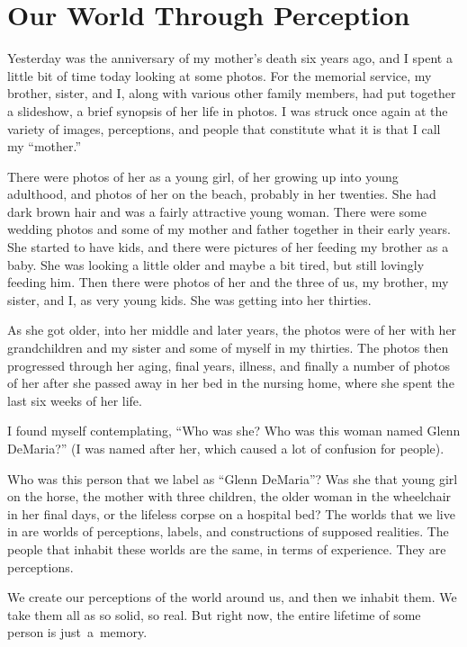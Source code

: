 
\chapter{Our World Through Perception}

Yesterday was the anniversary of my mother's death six years ago, and I spent a little bit of time today looking at some photos. For the memorial service, my brother, sister, and I, along with various other family members, had put together a slideshow, a brief synopsis of her life in photos. I was struck once again at the variety of images, perceptions, and people that constitute what it is that I call my ``mother.''

There were photos of her as a young girl, of her growing up into young adulthood, and photos of her on the beach, probably in her twenties. She had dark brown hair and was a fairly attractive young woman. There were some wedding photos and some of my mother and father together in their early years. She started to have kids, and there were pictures of her feeding my brother as a baby. She was looking a little older and maybe a bit tired, but still lovingly feeding him. Then there were photos of her and the three of us, my brother, my sister, and I, as very young kids. She was getting into her thirties.

As she got older, into her middle and later years, the photos were of her with her grandchildren and my sister and some of myself in my thirties. The photos then progressed through her aging, final years, illness, and finally a number of photos of her after she passed away in her bed in the nursing home, where she spent the last six weeks of her life.

I found myself contemplating, ``Who was she? Who was this woman named Glenn DeMaria?'' (I was named after her, which caused a lot of confusion for people).

Who was this person that we label as ``Glenn DeMaria''? Was she that young girl on the horse, the mother with three children, the older woman in the wheelchair in her final days, or the lifeless corpse on a hospital bed? The worlds that we live in are worlds of perceptions, labels, and constructions of supposed realities. The people that inhabit these worlds are the same, in terms of experience. They are perceptions.

We create our perceptions of the world around us, and then we inhabit them. We take them all as so solid, so real. But right now, the entire lifetime of some person is \mbox{just a memory.}

